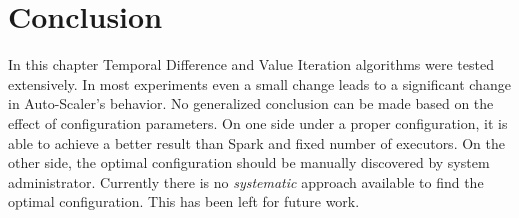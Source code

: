\section{Conclusion}
\label{eval:conc}
In this chapter Temporal Difference and Value Iteration algorithms were tested extensively. In most experiments even a small change leads to a significant change in Auto-Scaler's behavior. No generalized conclusion can be made based on the effect of configuration parameters. On one side under a proper configuration, it is able to achieve a better result than Spark and fixed number of executors. On the other side, the optimal configuration should be manually discovered by system administrator. Currently there is no \emph{systematic} approach available to find the optimal configuration. This has been left for future work.